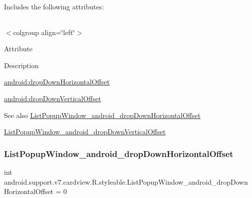 Includes the following attributes\+:

\tabulinesep=1mm
\begin{longtabu} spread 0pt [c]{*{0}{|X[-1]}|}
\hline
\end{longtabu}
$<$colgroup align=\char`\"{}left\char`\"{}$>$ 

Attribute

Description 

{\ttfamily \hyperlink{classandroid_1_1support_1_1v7_1_1cardview_1_1R_1_1styleable_a76e93c74efacea206f4f7eea287ea29e}{android\+:drop\+Down\+Horizontal\+Offset}}

{\ttfamily \hyperlink{classandroid_1_1support_1_1v7_1_1cardview_1_1R_1_1styleable_a20bb7afcc21fceebe839a1c04c8a648b}{android\+:drop\+Down\+Vertical\+Offset}}

\begin{DoxySeeAlso}{See also}
\hyperlink{classandroid_1_1support_1_1v7_1_1cardview_1_1R_1_1styleable_a76e93c74efacea206f4f7eea287ea29e}{List\+Popup\+Window\+\_\+android\+\_\+drop\+Down\+Horizontal\+Offset} 

\hyperlink{classandroid_1_1support_1_1v7_1_1cardview_1_1R_1_1styleable_a20bb7afcc21fceebe839a1c04c8a648b}{List\+Popup\+Window\+\_\+android\+\_\+drop\+Down\+Vertical\+Offset} 
\end{DoxySeeAlso}
\mbox{\label{classandroid_1_1support_1_1v7_1_1cardview_1_1R_1_1styleable_a76e93c74efacea206f4f7eea287ea29e}} 
\subsubsection{\texorpdfstring{List\+Popup\+Window\+\_\+android\+\_\+drop\+Down\+Horizontal\+Offset}{ListPopupWindow\_android\_dropDownHorizontalOffset}}
{\footnotesize\ttfamily int android.\+support.\+v7.\+cardview.\+R.\+styleable.\+List\+Popup\+Window\+\_\+android\+\_\+drop\+Down\+Horizontal\+Offset = 0\hspace{0.3cm}{\ttfamily [static]}}

